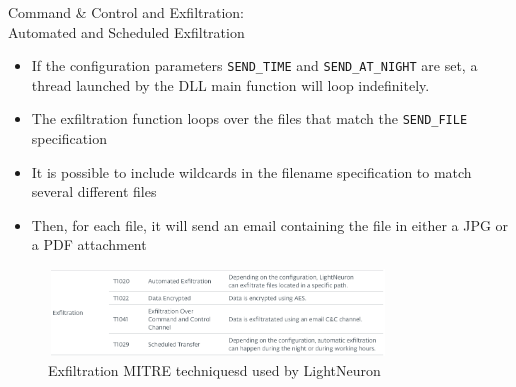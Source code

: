 \begin{frame}[fragile]{Command \& Control and Exfiltration: \\Automated and Scheduled Exfiltration}
    \begin{itemize}
        \item If the configuration parameters \texttt{SEND\_TIME} and \texttt{SEND\_AT\_NIGHT} are set, 
        a thread launched by the DLL main function will loop indefinitely.
        \item The exfiltration function loops over the files that match the \texttt{SEND\_FILE} specification
        \item It is possible to include wildcards in the filename specification to match several different files 
        \item Then, for each file, it will send an email containing the file in either a JPG or a PDF attachment
    \end{itemize}
    \begin{figure}
        \includegraphics[height=2.3cm, width=9cm]{figures/exfiltration.PNG}
        \caption{Exfiltration MITRE techniquesd used by LightNeuron}
    \end{figure}
\end{frame}
